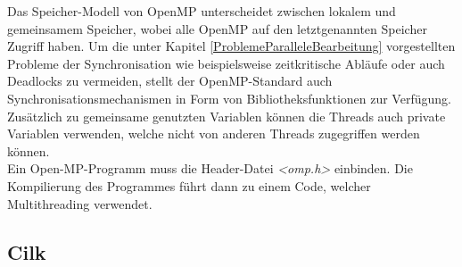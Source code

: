 			Das Speicher-Modell von OpenMP unterscheidet zwischen lokalem und gemeinsamem Speicher, wobei alle OpenMP auf den letztgenannten Speicher Zugriff haben. Um die unter Kapitel \ref{ProblemeParalleleBearbeitung} vorgestellten Probleme der Synchronisation wie beispielsweise zeitkritische Abläufe oder auch Deadlocks zu vermeiden, stellt der OpenMP-Standard auch Synchronisationsmechanismen in Form von Bibliotheksfunktionen zur Verfügung. Zusätzlich zu gemeinsame genutzten Variablen können die Threads auch private Variablen verwenden, welche nicht von anderen Threads zugegriffen werden können.\\
			Ein Open-MP-Programm muss die Header-Datei \textit{<omp.h>} einbinden. Die Kompilierung des Programmes führt dann zu einem Code, welcher Multithreading verwendet. \cite{ParaProgRauber} \cite{OpenMPWikipedia}
			
		\subsection{Cilk}
		\label{Cilk}
		
